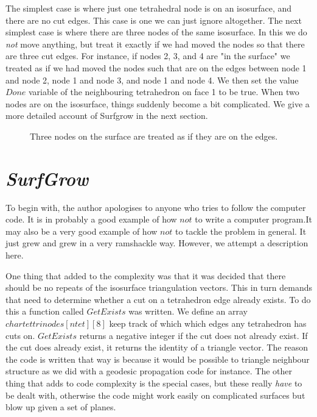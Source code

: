 \documentclass[12pt]{article}
\begin{document}
The simplest case is where just one tetrahedral node is on an isosurface, and there are no cut edges. 
This case is one  we can just ignore altogether. The next simplest case is
 where there are three nodes of the same isosurface. In this we do {\it not} 
move anything, but treat it exactly if we had moved the nodes so that there
 are three cut edges.  For instance, if nodes 2, 3, and 4 are "in the surface"  
 we treated as if we had moved the nodes such that are on the edges between
 node 1 and node 2, node 1 and node 3, and node 1 and node 4. We then set 
the value $Done$ variable of the neighbouring tetrahedron on face 1 to be true.
When two nodes are on the isosurface, things suddenly become a bit complicated.
We give a more detailed account of Surfgrow in the next section.
 
\begin{figure}
\vspace*{14cm}
\caption{Three nodes on the surface are treated as if they are on the edges.}
\end{figure}

\section{ {\it SurfGrow}}

To begin with, the author apologises to anyone who tries to follow the computer code. It is in probably a good example of how $not$ to write a computer program.It may also be a very good example of how $not$ to tackle the problem in general. It just grew and grew in a very ramshackle way. However, we attempt a description here.

One thing that added to the complexity was that it was decided that there should be no repeats of the isosurface triangulation vectors. This in turn demands that need to determine whether a cut on a tetrahedron  edge already exists. To 
do this a function called $GetExists$ was written. We define an array 
$ char tettrinodes[ntet][8]$ keep track of which which edges any
 tetrahedron has cuts on. $GetExists$ returns a negative integer if 
the cut does not already exist. If the cut does already exist, it returns the
identity of a triangle vector. The reason the code is written that way is
because it would be possible to triangle neighbour structure as we did
with a geodesic propagation code for instance. The other thing that adds to
code complexity is the special cases, but these really {\it have} to be dealt
with, otherwise the code might work easily on complicated surfaces but blow 
up given a set of planes.
\end{document}
